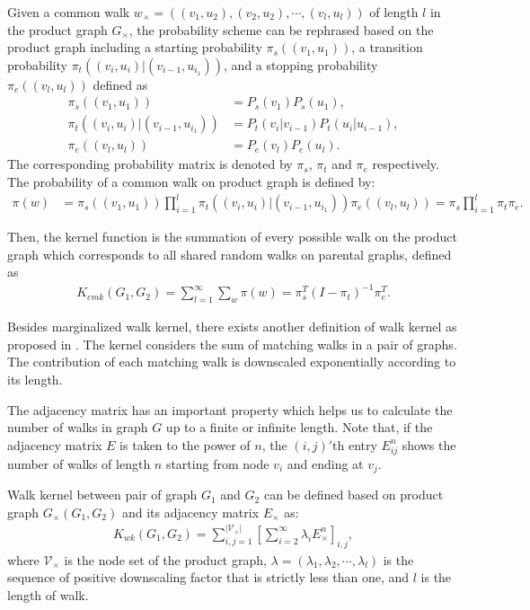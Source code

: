 \documentclass[english]{tktltiki}
\newcommand{\Vcal}{\mathcal{V}}
\begin{document}
Given a common walk $w_{\times} = ((v_1,u_2),(v_2,u_2),\cdots,(v_l,u_l))$ of length $l$ in the product graph $G_{\times}$, the probability scheme can be rephrased based on the product graph including a starting probability $\pi_s((v_1,u_1))$, a transition probability $\pi_t((v_i,u_i)|(v_{i-1},u_{i_1}))$, and a stopping probability $\pi_e((v_l,u_l))$ defined as
\begin{align*}
\pi_s((v_1,u_1)) &= P_s(v_1)P_s(u_1), \\
\pi_t((v_i,u_i)|(v_{i-1},u_{i_1})) &= P_t(v_i|v_{i-1})P_t(u_i|u_{i-1}), \\
\pi_e((v_l,u_l)) &= P_e(v_l)P_e(u_l).
\end{align*}
The corresponding probability matrix is denoted by $\pi_s$, $\pi_t$ and $\pi_e$ respectively. The probability of a common walk on product graph is defined by:
\begin{align*}
\pi(w) &= \pi_s((v_1,u_1)) \prod_{i = 1}^{l}{\pi_t((v_i,u_i)|(v_{i-1},u_{i_1}))} \pi_e((v_l,u_l)) = \pi_s \prod_{i = 1}^{l}{\pi_t} \pi_e.
\end{align*}

Then, the kernel function is the summation of every possible walk on the product graph which corresponds to all shared random walks on parental graphs, defined as
\begin{align*}
K_{emk}(G_1,G_2) = \sum_{l=1}^{\infty}\sum_{w}{\pi(w)} = \pi_s^T (I-\pi_t)^{-1} \pi_e^T. 
\end{align*}



Besides marginalized walk kernel, there exists another definition of walk kernel as proposed in \cite{gartner03, gartner03a}. The kernel considers the sum of matching walks in a pair of graphs. The contribution of each matching walk is downscaled exponentially according to its length.

The adjacency matrix has an important property which helps us to calculate the number of walks in graph $G$ up to a finite or infinite length. Note that, if the adjacency matrix \(E\) is taken to the power of \(n\), the \((i, j)'\text{th}\) entry \(E_{ij}^n\) shows the number of walks of length \(n\) starting from node \(v_i\) and ending at \(v_j\).

Walk kernel between pair of graph $G_1$ and $G_2$ can be defined based on product graph $G_{\times}(G_1,G_2)$ and its adjacency matrix $E_{\times}$ as:
\begin{align}
K_{wk}(G_1,G_2) = \displaystyle\sum_{i,j = 1}^{\vert \Vcal_{\times} \vert }{\left[\sum_{i=2}^{\infty}{\lambda_i E_\times^n}\right]_{i,j}},
\label{wk_definition_1}
\end{align}
where \(\Vcal_{\times}\) is the node set of the product graph, \(\lambda = (\lambda_1, \lambda_2, \cdots, \lambda_l)\) is the sequence of positive downscaling factor that is strictly less than one, and \(l\) is the length of walk. 
\end{document}
